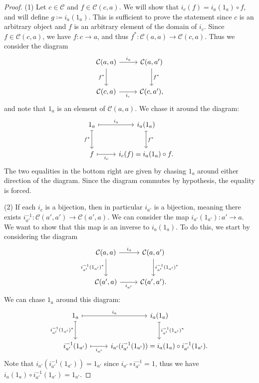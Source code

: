 \begin{proof}
	(1) Let $c\in \mathcal{C} $ and $f\in \mathcal{C} (c,a)$. We will show that $i_c(f) = i_a(1_a)\circ f$, and will define $g\coloneqq i_a(1_a)$. This is sufficient to prove the statement since $c$ is an arbitrary object and $f$ is an arbitrary element of the domain of $i_c$. Since $f\in \mathcal{C} (c,a)$, we have $f : c \to a$, and thus $f^* : \mathcal{C} (a,a) \to \mathcal{C} (c,a)$. Thus we consider the diagram
	\[\begin{tikzcd}[row sep = 2.5em, column sep = 2.5em]
		\mathcal{C} (a,a)\ar[" i_a ", r] \ar[" f^* "', d]  & \mathcal{C} (a,a')\ar[" f^* ", d]  \\
	\mathcal{C} (c,a)\ar[" i_c "', r]  & \mathcal{C} (c,a'),
	\end{tikzcd}\]
	and note that $1_a$ is an element of $\mathcal{C} (a,a)$. We chase it around the diagram:
	\[\begin{tikzcd}[row sep = 2.5em, column sep = 2.5em]
	1_a \ar[" i_a ", mapsto, r] \ar[" f^* "', mapsto, d]  & i_a(1_a) \ar[" f^* ", mapsto, d] \\
	f \ar[" i_c "', mapsto, r]  & i_c(f) = i_a(1_a)\circ f.
	\end{tikzcd}\]
	The two equalities in the bottom right are given by chasing $1_a$ around either direction of the diagram. Since the diagram commutes by hypothesis, the equality is forced.

	(2) If each $i_c$ is a bijection, then in particular $i_{a'}$ is a bijection, meaning there exists $i_{a'}^{-1} : \mathcal{C} (a',a') \to \mathcal{C} (a',a)$. We can consider the map $i_{a'} (1_{a'} ): a' \to a$. We want to show that this map is an inverse to $i_a(1_a)$. To do this, we start by considering the diagram
	\[\begin{tikzcd}[row sep = 2.5em, column sep = 2.5em]
	\mathcal{C} (a,a)\ar[" i_a ", r] \ar[" i_{a'} ^{-1} (1_{a'} )^* "', d]  & \mathcal{C} (a,a')\ar[" i_{a'} ^{-1} (1_{a'} )^* ", d]  \\
	\mathcal{C} (a',a)\ar[" i_{a'}  "', r]  & \mathcal{C} (a',a').
	\end{tikzcd}\]
	We can chase $1_a$ around this diagram:
	\[\begin{tikzcd}[row sep = 2.5em, column sep = 2.5em]
	1_a\ar[" i_a ", mapsto, r] \ar[" i_{a'} ^{-1} (1_{a'} )^* "', mapsto, d]  & i_a(1_a)\ar[" i_{a'} ^{-1} (1_{a'} )^* ", mapsto, d]  \\
	i_{a'} ^{-1} (1_{a'} )\ar[" i_{a'}  "', mapsto, r]  & i_{a'} (i_{a'} ^{-1} (1_{a'} )) = i_a(1_a)\circ i_{a'} ^{-1} (1_{a'} ).
	\end{tikzcd}\]
	Note that $i_{a'} (i_{a'} ^{-1} (1_{a'} ))=1_{a'} $ since $i_{a'} \circ i_{a'} ^{-1} =1$, thus we have $i_a(1_a)\circ i_{a'} ^{-1} (1_{a'} )=1_{a'} $.


\end{proof}
